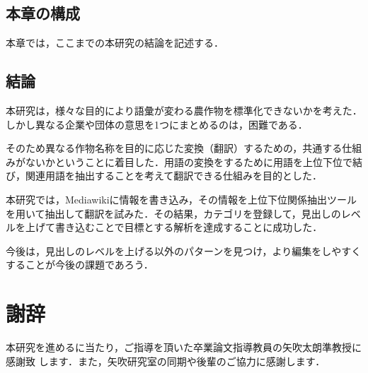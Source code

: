 \section{本章の構成}
本章では，ここまでの本研究の結論を記述する．

\section{結論}
本研究は，様々な目的により語彙が変わる農作物を標準化できないかを考えた．しかし異なる企業や団体の意思を1つにまとめるのは，困難である．

そのため異なる作物名称を目的に応じた変換（翻訳）するための，共通する仕組みがないかということに着目した．用語の変換をするために用語を上位下位で結び，関連用語を抽出することを考えて翻訳できる仕組みを目的とした．

本研究では，Mediawikiに情報を書き込み，その情報を上位下位関係抽出ツールを用いて抽出して翻訳を試みた．その結果，カテゴリを登録して，見出しのレベルを上げて書き込むことで目標とする解析を達成することに成功した．

今後は，見出しのレベルを上げる以外のパターンを見つけ，より編集をしやすくすることが今後の課題であろう．

\chapter*{謝辞}
本研究を進めるに当たり，ご指導を頂いた卒業論文指導教員の矢吹太朗準教授に感謝致 します．また，矢吹研究室の同期や後輩のご協力に感謝します．







